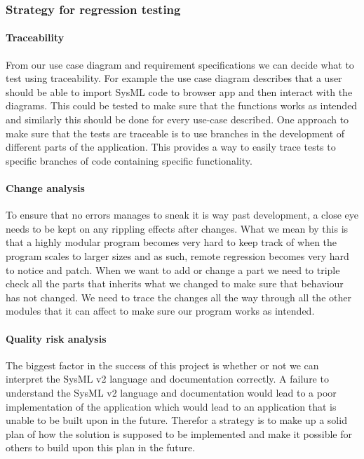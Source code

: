 \documentclass{article}
\begin{document}
\subsubsection{Strategy for regression testing}

\paragraph{Traceability}
From our use case diagram and requirement specifications we can decide what to test using traceability. For example the use case diagram describes that a user should be able to import SysML code to browser app and then interact with the diagrams. This could be tested to make sure that the functions works as intended and similarly this should be done for every use-case described. One approach to make sure that the tests are traceable is to use branches in the development of different parts of the application. This provides a way to easily trace tests to specific branches of code containing specific functionality.

\paragraph{Change analysis}
To ensure that no errors manages to sneak it is way past development, a close eye needs to be kept on any rippling effects after changes. What we mean by this is that a highly modular program becomes very hard to keep track of when the program scales to larger sizes and as such, remote regression becomes very hard to notice and patch. When we want to add or change a part we need to triple check all the parts that inherits what we changed to make sure that behaviour has not changed. We need to trace the changes all the way through all the other modules that it can affect to make sure our program works as intended.

\paragraph{Quality risk analysis}
The biggest factor in the success of this project is whether or not we can interpret the SysML v2 language and documentation correctly. A failure to understand the SysML v2 language and documentation would lead to a poor implementation of the application which would lead to an application that is unable to be built upon in the future. Therefor a strategy is to make up a solid plan of how the solution is supposed to be implemented and make it possible for others to build upon this plan in the future.
\end{document}
